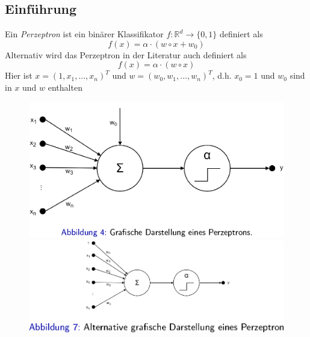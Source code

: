 \documentclass{report}
\begin{document}
  \subsection{Einführung}	
  Ein \textit{Perzeptron} ist ein binärer Klassifikator $f: \mathbb{R}^d \rightarrow\{0,1\}$ definiert als	
  $$f(x) = \alpha \cdot(w\circ x + w_0)$$	
  Alternativ wird das Perzeptron in der Literatur auch definiert als	
  $$f(x) = \alpha \cdot (w\circ x)$$	
  Hier ist $x = (1, x_1, ..., x_n)^T$ und $w = (w_0, w_1, ..., w_n)^T$, d.h. $x_0 = 1$ und $w_0$ sind in $x$ und $w$ enthalten	
  \begin{figure}[H]	
    \centering	
    \begin{minipage}[b]{0.4\textwidth}	
      \includegraphics[scale=.2]{ml04_1}	
    \end{minipage}	
    \hfill	
    \begin{minipage}[b]{0.4\textwidth}	
      \includegraphics[scale=.325]{ml04_6}	
    \end{minipage}	
  \end{figure}	
  
\end{document}
